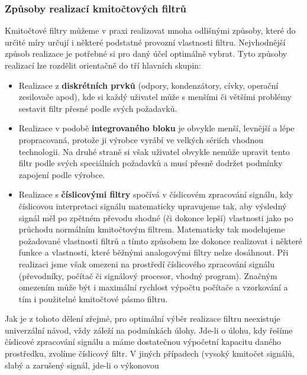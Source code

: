 {      \subsubsection{Způsoby realizací kmitočtových filtrů}
        Kmitočtové filtry můžeme v praxi realizovat mnoha odlišnými způsoby, které do určité míry
        určují i některé podstatné provozní vlastnosti filtru. Nejvhodnější způsob realizace je
        potřebné si pro daný účel optimálně vybrat. Tyto způsoby realizací lze rozdělit orientačně
         do tří hlavních skupin:
        \begin{itemize}
          \item Realizace z \textbf{diskrétních prvků} (odpory, kondenzátory, cívky, operační
                zesilovače apod), kde si každý uživatel může s menšími či většími problémy sestavit
                filtr přesné podle svých požadavků.
          \item Realizace v podobě \textbf{integrovaného bloku} je obvykle menší, levnější a lépe
                propracovaná, protože ji výrobce vyrábí ve velkých sériích vhodnou technologii. Na
                druhé straně si však uživatel obvykle nemůže upravit tento filtr podle svých
                speciálních požadavků a musí přesně dodržet podmínky zapojení podle výrobce.
          \item Realizace s \textbf{číslicovými filtry} spočívá v číslicovém zpracování signálu, kdy
                číslicovou interpretaci signálu matematicky upravujeme tak, aby výsledný signál měl
                po zpětném převodu shodné (či dokonce lepší) vlastnosti jako po průchodu normálním
                kmitočtovým filtrem. Matematicky tak modelujeme požadované vlastnosti filtrů a tímto
                způsobem lze dokonce realizovat i některé funkce a vlastnosti, které běžnými
                analogovými filtry nelze dosáhnout. Při realizaci jsme však omezeni na prostředí
                číslicového zpracování signálu (převodníky, počítač či signálový procesor, vhodný
                program). Značným omezením může být i maximální rychlost výpočtu počítače a
                vzorkování a tím i použitelné kmitočtové pásmo filtru.         
        \end{itemize}
        Jak je z tohoto dělení zřejmé, pro optimální výběr realizace filtru neexistuje univerzální
        návod, vždy záleží na podmínkách úlohy. Jde-li o úlohu, kdy řešíme číslicové zpracování
        signálu a máme dostatečnou výpočetní kapacitu daného prostředku, zvolíme číslicový filtr. V
        jiných případech (vysoký kmitočet signálů, slabý a zarušený signál, jde-li o výkonovou
}
